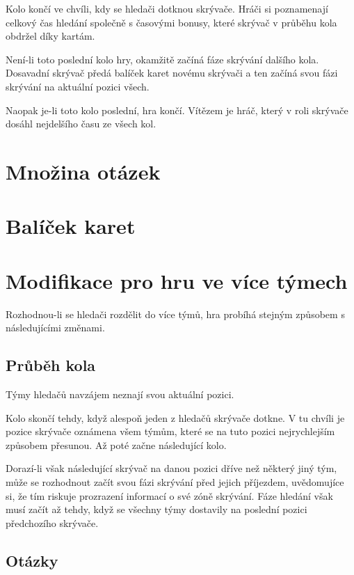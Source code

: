 \documentclass{book}
\begin{document}
Kolo končí ve chvíli, kdy se hledači dotknou skrývače. Hráči si poznamenají celkový čas hledání společně s časovými bonusy, které skrývač v průběhu kola obdržel díky kartám.

Není-li toto poslední kolo hry, okamžitě začíná fáze skrývání dalšího kola. Dosavadní skrývač předá balíček karet novému skrývači a ten začíná svou fázi skrývání na aktuální pozici všech.

Naopak je-li toto kolo poslední, hra končí. Vítězem je hráč, který v roli skrývače dosáhl nejdelšího času ze všech kol.

\section{Množina otázek}\label{otázky}



\section{Balíček karet}\label{karty}



\section{Modifikace pro hru ve více týmech}\label{týmy}

Rozhodnou-li se hledači rozdělit do více týmů, hra probíhá stejným způsobem s následujícími změnami.

\subsection{Průběh kola}

Týmy hledačů navzájem neznají svou aktuální pozici.

Kolo skončí tehdy, když alespoň jeden z hledačů skrývače dotkne. V tu chvíli je pozice skrývače oznámena všem týmům, které se na tuto pozici nejrychlejším způsobem přesunou. Až poté začne následující kolo.

Dorazí-li však následující skrývač na danou pozici dříve než některý jiný tým, může se rozhodnout začít svou fázi skrývání před jejich příjezdem, uvědomujíce si, že tím riskuje prozrazení informací o své zóně skrývání. Fáze hledání však musí začít až tehdy, když se všechny týmy dostavily na poslední pozici předchozího skrývače.

\subsection{Otázky}
\end{document}
